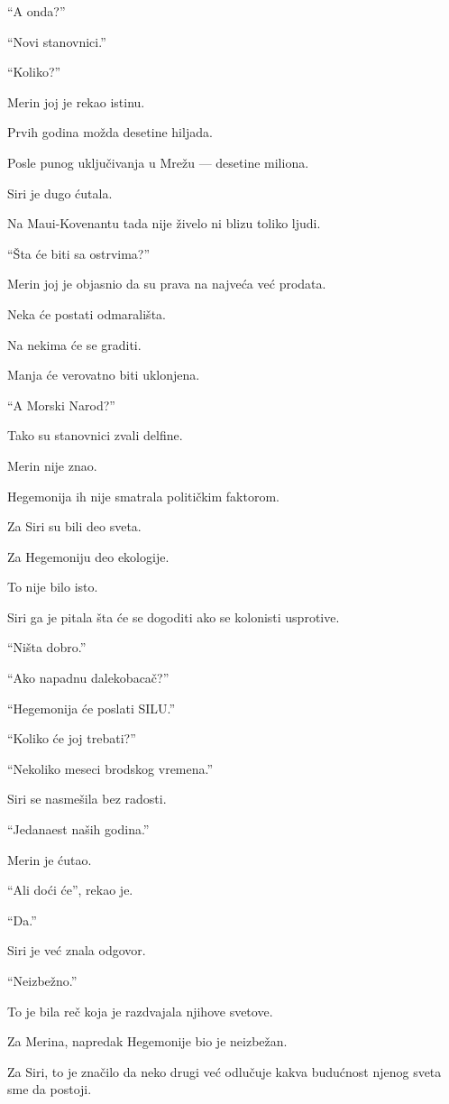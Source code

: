 ``A onda?''

``Novi stanovnici.''

``Koliko?''

Merin joj je rekao istinu.

Prvih godina možda desetine hiljada.

Posle punog uključivanja u Mrežu --- desetine miliona.

Siri je dugo ćutala.

Na Maui-Kovenantu tada nije živelo ni blizu toliko ljudi.

``Šta će biti sa ostrvima?''

Merin joj je objasnio da su prava na najveća već prodata.

Neka će postati odmarališta.

Na nekima će se graditi.

Manja će verovatno biti uklonjena.

``A Morski Narod?''

Tako su stanovnici zvali delfine.

Merin nije znao.

Hegemonija ih nije smatrala političkim faktorom.

Za Siri su bili deo sveta.

Za Hegemoniju deo ekologije.

To nije bilo isto.

\bigskip

Siri ga je pitala šta će se dogoditi ako se kolonisti usprotive.

``Ništa dobro.''

``Ako napadnu dalekobacač?''

``Hegemonija će poslati SILU.''

``Koliko će joj trebati?''

``Nekoliko meseci brodskog vremena.''

Siri se nasmešila bez radosti.

``Jedanaest naših godina.''

Merin je ćutao.

``Ali doći će'', rekao je.

``Da.''

Siri je već znala odgovor.

``Neizbežno.''

To je bila reč koja je razdvajala njihove svetove.

Za Merina, napredak Hegemonije bio je neizbežan.

Za Siri, to je značilo da neko drugi već odlučuje kakva budućnost njenog sveta sme da postoji.

